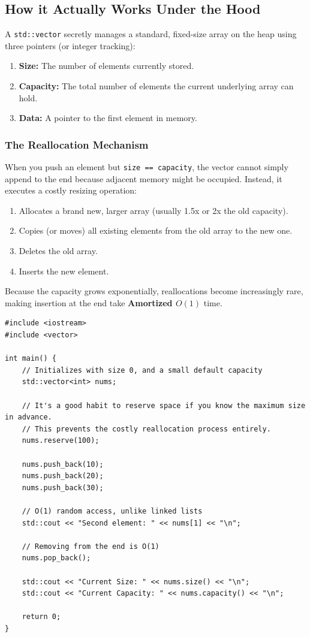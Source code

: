 \documentclass{article}
\begin{document}
\subsection{How it Actually Works Under the Hood}

A \texttt{std::vector} secretly manages a standard, fixed-size array on the heap using three pointers (or integer tracking):
\begin{enumerate}
    \item \textbf{Size:} The number of elements currently stored.
    \item \textbf{Capacity:} The total number of elements the current underlying array can hold.
    \item \textbf{Data:} A pointer to the first element in memory.
\end{enumerate}

\subsubsection{The Reallocation Mechanism}
When you push an element but \texttt{size == capacity}, the vector cannot simply append to the end because adjacent memory might be occupied. Instead, it executes a costly resizing operation:
\begin{enumerate}
    \item Allocates a brand new, larger array (usually 1.5x or 2x the old capacity).
    \item Copies (or moves) all existing elements from the old array to the new one.
    \item Deletes the old array.
    \item Inserts the new element.
\end{enumerate}

Because the capacity grows exponentially, reallocations become increasingly rare, making insertion at the end take \textbf{Amortized $O(1)$} time.

\begin{lstlisting}
#include <iostream>
#include <vector>

int main() {
    // Initializes with size 0, and a small default capacity
    std::vector<int> nums; 

    // It's a good habit to reserve space if you know the maximum size in advance.
    // This prevents the costly reallocation process entirely.
    nums.reserve(100); 

    nums.push_back(10);
    nums.push_back(20);
    nums.push_back(30);

    // O(1) random access, unlike linked lists
    std::cout << "Second element: " << nums[1] << "\n"; 

    // Removing from the end is O(1)
    nums.pop_back();

    std::cout << "Current Size: " << nums.size() << "\n";
    std::cout << "Current Capacity: " << nums.capacity() << "\n";

    return 0;
}
\end{lstlisting}
\end{document}
